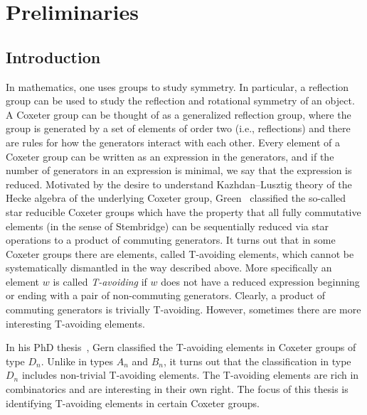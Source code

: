 \chapter{Preliminaries}

\section{Introduction}
In mathematics, one uses groups to study symmetry.  In particular, a reflection group can be used to study the reflection and rotational symmetry of an object.  A Coxeter group can be thought of as a generalized reflection group, where the group is generated by a set of elements of order two (i.e., reflections) and there are rules for how the generators interact with each other.  Every element of a Coxeter group can be written as an expression in the generators, and if the number of generators in an expression is minimal, we say that the expression is reduced.  Motivated by the desire to understand Kazhdan--Lusztig theory of the Hecke algebra of the underlying Coxeter group, Green~\cite{Green2006a} classified the so-called star reducible Coxeter groups which have the property that all fully commutative elements (in the sense of Stembridge) can be sequentially reduced via star operations to a product of commuting generators. It turns out that in some Coxeter groups there are elements, called T-avoiding elements, which cannot be systematically dismantled in the way described above. More specifically an element $w$ is called \emph{T-avoiding} if $w$ does not have a reduced expression beginning or ending with a pair of non-commuting generators. Clearly, a product of commuting generators is trivially T-avoiding. However, sometimes there are more interesting T-avoiding elements. 

In his PhD thesis~\cite{Gern2013a}, Gern classified the T-avoiding elements in Coxeter groups of type $D_n$. Unlike in types $A_n$ and $B_n$, it turns out that the classification in type $D_n$ includes non-trivial T-avoiding elements. The T-avoiding elements are rich in combinatorics and are interesting in their own right. The focus of this thesis is identifying T-avoiding elements in certain Coxeter groups.

